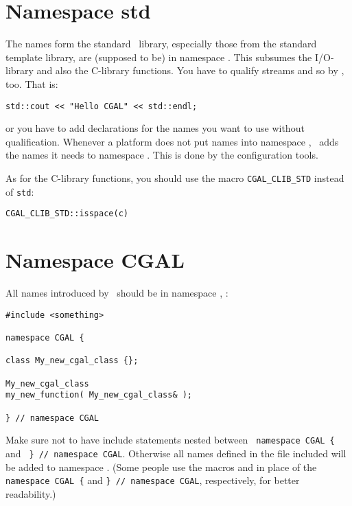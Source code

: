 \section{Namespace std}
The names form the standard \CC\ library, especially those from the standard
template library, are (supposed to be) in namespace . This subsumes
the I/O-library%
and also the C-library%
 functions. You have to qualify streams and so by
, too.  That is:
\begin{verbatim}
std::cout << "Hello CGAL" << std::endl;
\end{verbatim}
or you have to add  declarations for the names you want to
use without  qualification. Whenever a platform does not
put names into namespace , \cgal\ adds the names it needs to
namespace . This is done by the configuration tools.

As for the C-library functions, you should use the macro 
\texttt{CGAL\_CLIB\_STD} instead of \texttt{std}:
\begin{verbatim}
CGAL_CLIB_STD::isspace(c)
\end{verbatim}

\section{Namespace CGAL}
All names introduced by \cgal\ should be in namespace , \eg: 
\begin{verbatim}
#include <something>

namespace CGAL {

class My_new_cgal_class {};

My_new_cgal_class 
my_new_function( My_new_cgal_class& );

} // namespace CGAL
\end{verbatim}
Make sure not to have include statements nested between 
\verb+ namespace CGAL { + and \verb+ } // namespace CGAL+.
Otherwise all names defined in the file included will be 
added to namespace .  (Some people use the macros
 and  
in place of the \texttt{namespace CGAL \{} and
\texttt{\} // namespace CGAL}, respectively, for better readability.)

